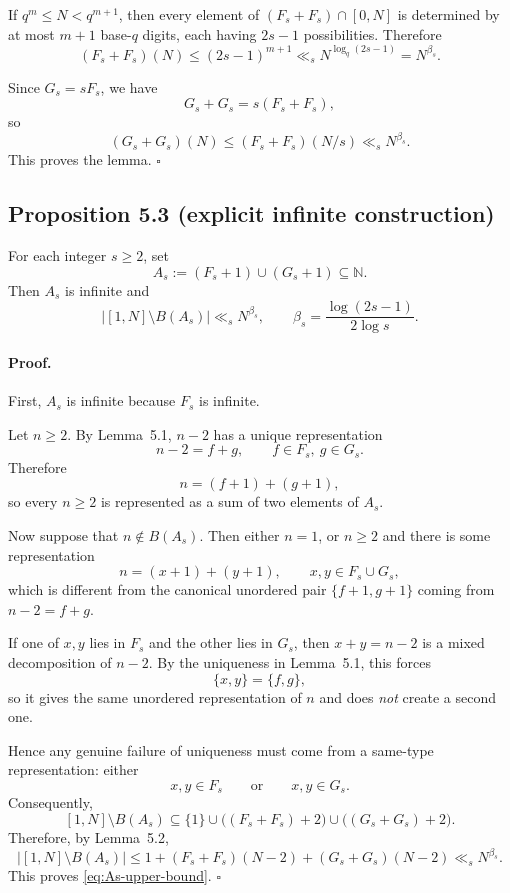 If $q^m\le N<q^{m+1}$, then every element of $(F_s+F_s)\cap[0,N]$ is determined by at most $m+1$ base-$q$ digits, each having $2s-1$ possibilities. Therefore
\[
(F_s+F_s)(N)\le (2s-1)^{m+1}
\ll_s N^{\log_q(2s-1)}
= N^{\beta_s}.
\]

Since $G_s=sF_s$, we have
\[
G_s+G_s=s(F_s+F_s),
\]
so
\[
(G_s+G_s)(N)\le (F_s+F_s)(N/s)\ll_s N^{\beta_s}.
\]
This proves the lemma.
\hfill$\square$

\subsection*{Proposition 5.3 (explicit infinite construction)}
For each integer $s\ge 2$, set
\[
A_s:=(F_s+1)\cup(G_s+1)\subseteq\mathbb N.
\]
Then $A_s$ is infinite and
\begin{equation}
\label{eq:As-upper-bound}
|[1,N]\setminus B(A_s)|\ll_s N^{\beta_s},
\qquad \beta_s=\frac{\log(2s-1)}{2\log s}.
\end{equation}

\paragraph{Proof.}
First, $A_s$ is infinite because $F_s$ is infinite.

Let $n\ge 2$. By Lemma~5.1, $n-2$ has a unique representation
\[
n-2=f+g,\qquad f\in F_s,\ g\in G_s.
\]
Therefore
\[
n=(f+1)+(g+1),
\]
so every $n\ge 2$ is represented as a sum of two elements of $A_s$.

Now suppose that $n\notin B(A_s)$. Then either $n=1$, or $n\ge 2$ and there is some representation
\[
n=(x+1)+(y+1),\qquad x,y\in F_s\cup G_s,
\]
which is different from the canonical unordered pair $\{f+1,g+1\}$ coming from $n-2=f+g$.

If one of $x,y$ lies in $F_s$ and the other lies in $G_s$, then $x+y=n-2$ is a mixed decomposition of $n-2$. By the uniqueness in Lemma~5.1, this forces
\[
\{x,y\}=\{f,g\},
\]
so it gives the same unordered representation of $n$ and does \emph{not} create a second one.

Hence any genuine failure of uniqueness must come from a same-type representation: either
\[
x,y\in F_s
\qquad\text{or}\qquad
x,y\in G_s.
\]
Consequently,
\[
[1,N]\setminus B(A_s)
\subseteq
\{1\}\cup \bigl((F_s+F_s)+2\bigr)\cup\bigl((G_s+G_s)+2\bigr).
\]
Therefore, by Lemma~5.2,
\[
|[1,N]\setminus B(A_s)|
\le 1+(F_s+F_s)(N-2)+(G_s+G_s)(N-2)
\ll_s N^{\beta_s}.
\]
This proves \eqref{eq:As-upper-bound}.
\hfill$\square$

